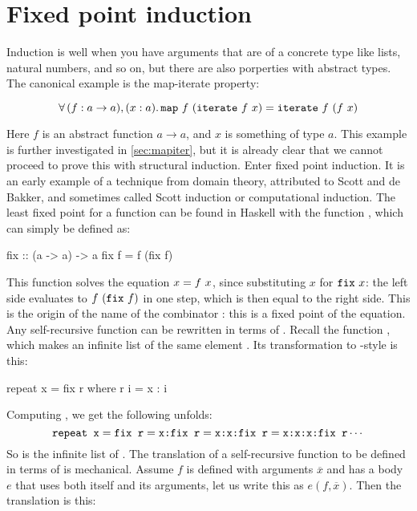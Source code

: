 \section{Fixed point induction}
\label{sec:fixpoint}

Induction is well when you have arguments that are of a concrete type
like lists, natural numbers, and so on, but there are also porperties
with abstract types. The canonical example is the map-iterate property:

\begin{equation*}
\faa{(f : a \rightarrow a)}{(x : a)} \hs{map} \w f \w (\hs{iterate} \w f \w x) \eq
           \hs{iterate} \w f \w (f \w x)
\end{equation*}

Here $f$ is an abstract function $a \rightarrow a$, and $x$ is
something of type $a$. This example is further investigated in
\ref{sec:mapiter}, but it is already clear that we cannot proceed to
prove this with structural induction.  Enter fixed point induction. It
is an early example of a technique from domain theory, attributed to
Scott and de Bakker,
and sometimes called Scott induction
or computational induction.  \cite{domains} The least fixed point for
a function can be found in Haskell with the function , which
can simply be defined as:

\begin{code}
fix :: (a -> a) -> a
fix f = f (fix f)
\end{code}

This function solves the equation $x = f \,\, x$, since substituting $x$
for $\hs{fix} \w x$: the left side evaluates to $f \w (\hs{fix} \w f)$
in one step, which is then equal to the right side. This is the origin
of the name of the combinator : this is a fixed point of the
equation.  Any self-recursive function can be rewritten in terms of
. Recall the  function , which makes an
infinite list of the same element . Its
transformation to -style is this:

\begin{code}
repeat x = fix r
  where r i = x : i
\end{code}

Computing , we get the following unfolds:
\begin{equation*}
  \hs{repeat x}
= \hs{fix r}
= \hs{x:fix r}
= \hs{x:x:fix r}
= \hs{x:x:x:fix r}
  \cdots
\end{equation*}
So  is the infinite list of . The translation of a
self-recursive function to be defined in terms of  is
mechanical. Assume $f$ is defined with arguments $\overline{x}$ and
has a body $e$ that uses both itself and its arguments, let us write
this as $e(f,\overline{x})$. Then the translation is this:

